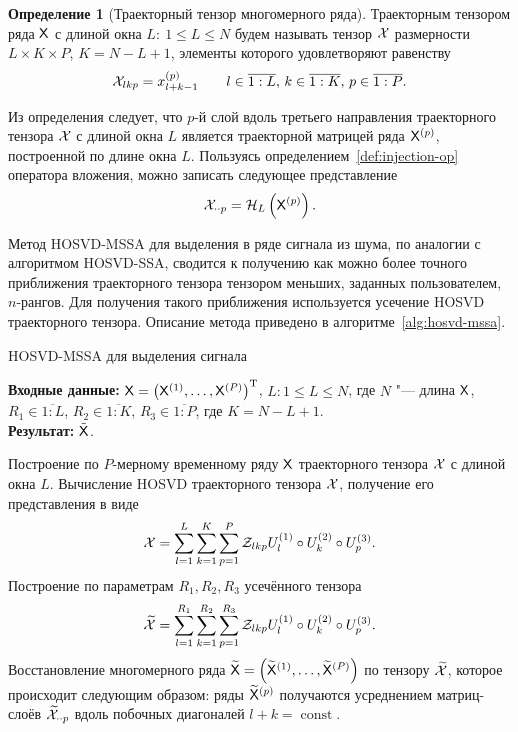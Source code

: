 \documentclass[specialist,
    substylefile = spbu.rtx,
    subf,href,colorlinks=true, 12pt]{disser}
\theoremstyle{plain}
\theoremstyle{definition}
\newtheorem{definition}{Определение}[section]
\theoremstyle{remark}
\newcommand{\Input}{\textbf{Входные данные: }}
\newcommand{\Output}{\textbf{Результат: }}
\begin{document}
    \begin{definition}[Траекторный тензор многомерного ряда]
        \label{def:trajectory-tensor-mssa}
        Траекторным тензором ряда $\mathsf{X}$ с длиной окна $L:\: 1\leqslant L \leqslant N$ будем называть тензор $\mathcal{X}$
        размерности ${L \times K \times P}$, ${K = N - L + 1}$, элементы которого удовлетворяют равенству
        \[
            \mathcal{X}_{lkp}=x_{l+k-1}^{(p)} \qquad l \in \overline{1:L},\, k \in \overline{1:K},\, p \in \overline{1:P}.
        \]
    \end{definition}
    
    Из определения следует, что $p$-й слой вдоль третьего направления траекторного тензора $\mathcal{X}$ с длиной окна $L$
    является траекторной матрицей ряда $\mathsf{X}^{(p)}$, построенной по длине окна $L$.
    Пользуясь определением~\ref{def:injection-op} оператора вложения, можно записать следующее представление
    \[
        \mathcal{X}_{\cdot \cdot p} = \mathcal{H}_L \left(\mathsf{X}^{(p)}\right).
    \]

    Метод HOSVD-MSSA для выделения в ряде сигнала из шума, по аналогии с алгоритмом HOSVD-SSA,
    сводится к получению как можно более точного приближения траекторного тензора тензором меньших,
    заданных пользователем, $n$-рангов.
    Для получения такого приближения используется усечение HOSVD траекторного тензора.
    Описание метода приведено в алгоритме~\ref{alg:hosvd-mssa}.

    \begin{algorithm}[!ht]
        \caption{HOSVD-MSSA для выделения сигнала}
        \label{alg:hosvd-mssa}
        \Input $\mathsf{X} = \left(\mathsf{X}^{(1)}, \ldots, \mathsf{X}^{(P)}\right)^{\mathrm{T}}$,
        $L: 1\leqslant L \leqslant N$, где $N$ "--- длина $\mathsf{X}$, $R_1 \in \overline{1:L}$,
        $R_2 \in \overline{1:K}$, $R_3 \in \overline{1:P}$, где $K = N-L+1$.\\
        \Output $\tilde{\mathsf{X}}$.
        \begin{algorithmic}[1]
            \State Построение по $P$-мерному временному ряду $\mathsf{X}$ траекторного тензора $\mathcal{X}$ с длиной окна $L$.
            \State Вычисление HOSVD траекторного тензора $\mathcal{X}$, получение его представления в виде
            \begin{equation}
                \mathcal{X} = \sum_{l=1}^{L} \sum_{k=1}^{K} \sum_{p=1}^{P} \mathcal{Z}_{lkp} U_l^{(1)}\circ U_k^{(2)} \circ U_p^{(3)}.
                \label{eq:hosvd-mssa}
            \end{equation}
            \State Построение по параметрам $R_1, R_2, R_3$ усечённого тензора
            \[
                \widetilde{\mathcal{X}}=\sum_{l=1}^{R_1} \sum_{k=1}^{R_2} \sum_{p=1}^{R_3} \mathcal{Z}_{lkp} U_l^{(1)}\circ U_k^{(2)} \circ U_p^{(3)}.
            \]
            \State \label{step:hosvd-mssa-sep-restoration} Восстановление многомерного ряда $\widetilde{\mathsf{X}}=\left(\widetilde{\mathsf{X}}^{(1)}, \ldots, \widetilde{\mathsf{X}}^{(P)}\right)$ по тензору
            $\widetilde{\mathcal{X}}$, которое происходит следующим образом:
            ряды $\widetilde{\mathsf{X}}^{(p)}$ получаются усреднением матриц-слоёв $\widetilde{\mathcal{X}}_{\cdot \cdot p}$ вдоль
            побочных диагоналей $l+k=\operatorname{const}$.
        \end{algorithmic}
    \end{algorithm}
    
\end{document}
